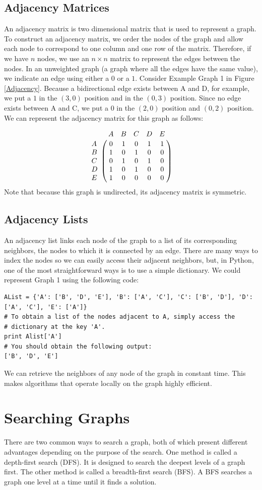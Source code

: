 \subsection*{Adjacency Matrices}
An adjacency matrix is two dimensional matrix that is used to represent a graph. To construct an adjacency matrix, we order
the nodes of the graph and allow each node to correspond to one column and one
row of the matrix. Therefore, if we have $n$ nodes, we use an $n \times n$ matrix to
represent the edges between the nodes. In an unweighted graph (a graph where all the edges have the same value), we indicate an
edge using either a $0$ or a $1$.
Consider Example Graph 1 in Figure \ref{Adjacency}. Because a bidirectional edge exists between A and D, for example, we put a $1$ in the $(3, 0)$ position and
in the $(0, 3)$ position. Since no edge exists between A and C, we put a $0$ in
the $(2, 0)$ position and $(0, 2)$ position. We can represent the adjacency matrix for this graph as follows:

\[
\bordermatrix{\hspace{.4cm}&A&B&C&D&E\cr
                A&0 & 1 & 0 & 1 & 1\cr
                B& 1 & 0 & 1 & 0 & 0\cr
                C& 0 & 1 & 0 & 1 & 0\cr
                D& 1 & 0 & 1 & 0 & 0\cr
                E& 1 & 0 & 0 & 0 & 0}\]
Note that because this graph is undirected, its adjacency matrix is symmetric.

\subsection*{Adjacency Lists}
An adjacency list links each node of the graph to a list of its corresponding neighbors, the nodes to which it is connected by an edge.
There are many ways to index the nodes so we can easily access their adjacent neighbors, but, in Python, one of the most straightforward ways is to use a simple dictionary.
We could represent Graph 1 using the following code:
\begin{lstlisting}
AList = {'A': ['B', 'D', 'E'], 'B': ['A', 'C'], 'C': ['B', 'D'], 'D': ['A', 'C'], 'E': ['A']}
# To obtain a list of the nodes adjacent to A, simply access the
# dictionary at the key 'A'.
print Alist['A']
# You should obtain the following output:
['B', 'D', 'E']
\end{lstlisting}
We can retrieve the neighbors of any node of the graph in constant time.
This makes algorithms that operate locally on the graph highly efficient.

\section*{Searching Graphs}
There are two common ways to search a graph, both of which present different advantages depending on the purpose of the search.
One method is called a depth-first search (DFS).  It is designed to search the deepest levels of a graph first.
The other method is called a breadth-first search (BFS).  A BFS searches a graph one level at a time until it finds a solution.

